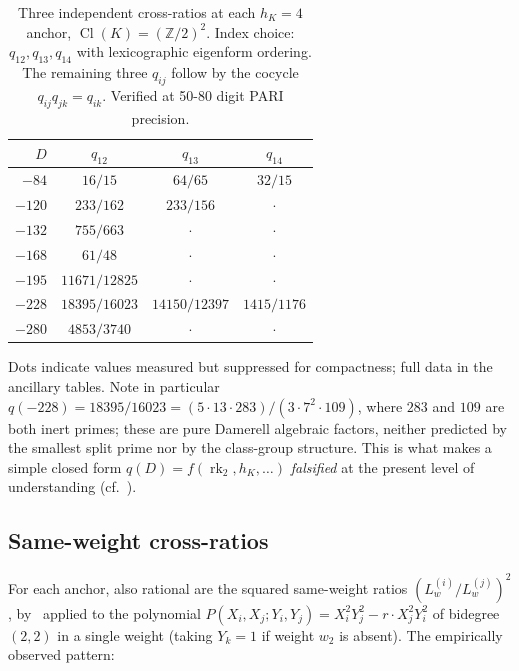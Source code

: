 \documentclass[11pt]{amsart}
\theoremstyle{definition}
\theoremstyle{remark}
\DeclareMathOperator{\Cl}{Cl}
\DeclareMathOperator{\rk}{rk}
\newcommand{\Z}{\mathbb{Z}}
\begin{document}
\begin{table}[h!]
\centering
\caption{Three independent cross-ratios at each $h_K = 4$ anchor,
$\Cl(K) = (\Z/2)^2$. Index choice: $q_{12}, q_{13}, q_{14}$ with
lexicographic eigenform ordering. The remaining three $q_{ij}$ follow
by the cocycle $q_{ij} q_{jk} = q_{ik}$. Verified at 50-80 digit PARI
precision.}
\label{tab:q-h4}
\begin{tabular}{rccc}
\toprule
$D$ & $q_{12}$ & $q_{13}$ & $q_{14}$ \\
\midrule
$-84$ & $16/15$ & $64/65$ & $32/15$ \\
$-120$ & $233/162$ & $233/156$ & $\cdot$ \\
$-132$ & $755/663$ & $\cdot$ & $\cdot$ \\
$-168$ & $61/48$ & $\cdot$ & $\cdot$ \\
$-195$ & $11671/12825$ & $\cdot$ & $\cdot$ \\
$-228$ & $18395/16023$ & $14150/12397$ & $1415/1176$ \\
$-280$ & $4853/3740$ & $\cdot$ & $\cdot$ \\
\bottomrule
\end{tabular}
\end{table}

Dots indicate values measured but suppressed for compactness; full
data in the ancillary tables. Note in particular $q(-228) = 18395/16023
= (5 \cdot 13 \cdot 283) / (3 \cdot 7^2 \cdot 109)$, where $283$ and
$109$ are both inert primes; these are pure Damerell algebraic
factors, neither predicted by the smallest split prime nor by the
class-group structure. This is what makes a simple closed form
$q(D) = f(\rk_2, h_K, \dots)$ \emph{falsified} at the present level of
understanding (cf.~).

\subsection{Same-weight cross-ratios}\label{ss:same-weight}
For each anchor, also rational are the squared same-weight ratios
$(L_w^{(i)} / L_w^{(j)})^2$, by~ applied to the
polynomial $P(X_i, X_j; Y_i, Y_j) = X_i^2 Y_j^2 - r \cdot X_j^2
Y_i^2$ of bidegree $(2,2)$ in a single weight (taking $Y_k = 1$ if
weight $w_2$ is absent). The empirically observed pattern:
\end{document}
